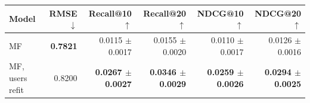 \begin{tabular}{lrrrrr}
\toprule
Model & RMSE $\downarrow$ & Recall@10 $\uparrow$ & Recall@20 $\uparrow$ & NDCG@10 $\uparrow$ & NDCG@20 $\uparrow$ \\
\midrule
MF & \textbf{0.7821} & 0.0115 $\pm$ 0.0017 & 0.0155 $\pm$ 0.0020 & 0.0110 $\pm$ 0.0017 & 0.0126 $\pm$ 0.0016 \\
MF, users refit & 0.8200 & \textbf{0.0267 $\pm$ 0.0027} & \textbf{0.0346 $\pm$ 0.0029} & \textbf{0.0259 $\pm$ 0.0026} & \textbf{0.0294 $\pm$ 0.0025} \\
\bottomrule
\end{tabular}
